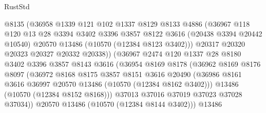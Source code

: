 \begin{lexlean}{RustStd}
\begin{coremodule}
                        @8135
                        (@36958
                          @1339
                          @121
                          @102
                          @1337
                          @8129
                          @8133
                          @4886
                          (@36967
                            @118
                            @120
                            @13
                            @28
                            @3394
                            @3402
                            @3396
                            @3857
                            @8122
                            @3616
                            (@20438 @3394 @20442 @10540)
                            @20570
                            @13486
                            (@10570 (@12384 @8123 @3402)))
                          @20317
                          @20320
                          @20323
                          @20327
                          @20332
                          @20338))
                      (@36967
                        @2474
                        @120
                        @1337
                        @28
                        @8180
                        @3402
                        @3396
                        @3857
                        @8143
                        @3616
                        (@36954
                          @8169
                          @8178
                          (@36962
                            @8169
                            @8176
                            @8097
                            (@36972
                              @8168
                              @8175
                              @3857
                              @8151
                              @3616
                              @20490
                              (@36986
                                @8161
                                @3616
                                @36997
                                @20570
                                @13486
                                (@10570 (@12384 @8162 @3402)))
                              @13486
                              (@10570 (@12384 @8152 @8168)))
                            @37013
                            @37016
                            @37019
                            @37023
                            @37028
                            @37034))
                        @20570
                        @13486
                        (@10570 (@12384 @8144 @3402)))
                      @13486

\end{coremodule}
\end{lexlean}
